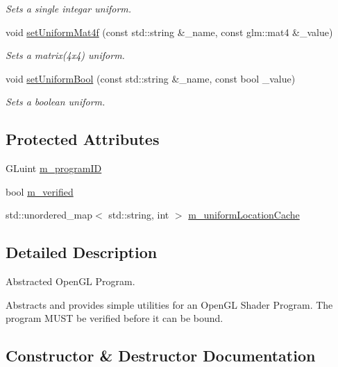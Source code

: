 \begin{DoxyCompactItemize}
\begin{DoxyCompactList}\small\item\em Sets a single integar uniform. \end{DoxyCompactList}\item 
void \hyperlink{class_cookie_eng_1_1_resources_1_1_shader_program_a172752bb917cb141b1a3a1cc44b6a645}{set\+Uniform\+Mat4f} (const std\+::string \&\+\_\+name, const glm\+::mat4 \&\+\_\+value)
\begin{DoxyCompactList}\small\item\em Sets a matrix(4x4) uniform. \end{DoxyCompactList}\item 
void \hyperlink{class_cookie_eng_1_1_resources_1_1_shader_program_aea57a6a608fe57a1057d3a038bac16dd}{set\+Uniform\+Bool} (const std\+::string \&\+\_\+name, const bool \+\_\+value)
\begin{DoxyCompactList}\small\item\em Sets a boolean uniform. \end{DoxyCompactList}\end{DoxyCompactItemize}
\subsection*{Protected Attributes}
\begin{DoxyCompactItemize}
\item 
G\+Luint \hyperlink{class_cookie_eng_1_1_resources_1_1_shader_program_a78e4cd26f128e78c0949476a79ff1c45}{m\+\_\+program\+ID}
\item 
bool \hyperlink{class_cookie_eng_1_1_resources_1_1_shader_program_a826816da20d45149ac950ed64daeda50}{m\+\_\+verified}
\item 
std\+::unordered\+\_\+map$<$ std\+::string, int $>$ \hyperlink{class_cookie_eng_1_1_resources_1_1_shader_program_aba82e0d018c8086308c0cda41e268735}{m\+\_\+uniform\+Location\+Cache}
\end{DoxyCompactItemize}


\subsection{Detailed Description}
Abstracted Open\+GL Program. 

Abstracts and provides simple utilities for an Open\+GL Shader Program. The program M\+U\+ST be verified before it can be bound. 

\subsection{Constructor \& Destructor Documentation}
\mbox{\label{class_cookie_eng_1_1_resources_1_1_shader_program_a2de1a879247aa4ee38fc2c37408c5285}} 
